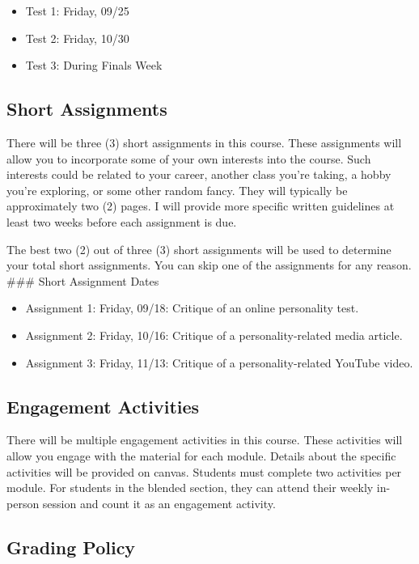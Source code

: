 \documentclass[11pt,]{article}
\begin{document}
\begin{itemize}
\item
  Test 1: Friday, 09/25
\item
  Test 2: Friday, 10/30
\item
  Test 3: During Finals Week
\end{itemize}

\subsection{Short Assignments}\label{short-assignments}

There will be three (3) short assignments in this course. These
assignments will allow you to incorporate some of your own interests
into the course. Such interests could be related to your career, another
class you're taking, a hobby you're exploring, or some other random
fancy. They will typically be approximately two (2) pages. I will
provide more specific written guidelines at least two weeks before each
assignment is due.

The best two (2) out of three (3) short assignments will be used to
determine your total short assignments. You can skip one of the
assignments for any reason. \#\#\# Short Assignment Dates

\begin{itemize}
\item
  Assignment 1: Friday, 09/18: Critique of an online personality test.
\item
  Assignment 2: Friday, 10/16: Critique of a personality-related media
  article.
\item
  Assignment 3: Friday, 11/13: Critique of a personality-related YouTube
  video.
\end{itemize}

\subsection{Engagement Activities}\label{engagement-activities}

There will be multiple engagement activities in this course. These
activities will allow you engage with the material for each module.
Details about the specific activities will be provided on canvas.
Students must complete two activities per module. For students in the
blended section, they can attend their weekly in-person session and
count it as an engagement activity.

\subsection{Grading Policy}\label{grading-policy}
\end{document}

